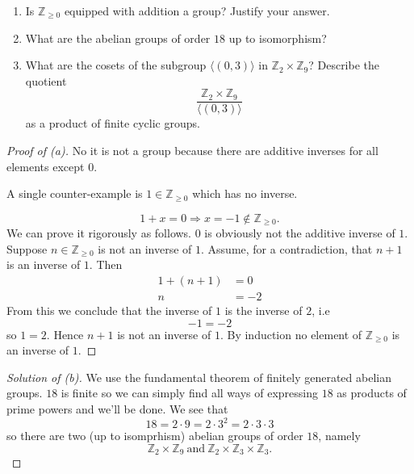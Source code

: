 \begin{prob}[1 Exam 2019]
    \begin{enumerate}[label=\alph*)]
        \item Is $\mathbb Z_{\geq 0}$ equipped with 
            addition a group? Justify your answer.

        \item What are the abelian groups of order $18$ up 
            to isomorphism?

        \item What are the cosets of the subgroup 
            $\langle (0,3)\rangle$ in $\mathbb Z_2 \times 
            \mathbb Z_9$? Describe the quotient 
            \[
                \frac{\mathbb Z_2 \times \mathbb Z_9}{
                    \langle(0,3)\rangle
                }
            \]
            as a product of finite cyclic groups.
    \end{enumerate}
\end{prob}
\begin{proof}[Proof of (a)]
    No it is not a group because there are additive inverses 
    for all elements except $0$. 

    A single counter-example is $1 \in \mathbb Z_{\geq 0}$ 
    which has no inverse.

    \[
        1 + x = 0 \Rightarrow x = -1 \not\in \mathbb Z_{\geq 0}.
    \]
    We can prove it rigorously as follows. 
    $0$ is obviously not the additive inverse of $1$. 
    Suppose $n \in \mathbb Z_{\geq 0}$ is not an inverse 
    of $1$. Assume, for a contradiction, that $n+1$ is 
    an inverse of $1$.
    Then 
    \begin{align*}
        1 + (n + 1) &= 0 \\ 
        n &= -2 
    \end{align*}
    From this we conclude that the inverse of $1$ is the 
    inverse of $2$, i.e 
    \[
        -1 = -2
    \]
    so $1 = 2$. Hence $n+1$ is not an inverse of $1$. 
    By induction no element of $\mathbb Z_{\geq 0}$ is an 
    inverse of $1$.
\end{proof}
\begin{proof}[Solution of (b)]
    We use the fundamental theorem of finitely generated 
    abelian groups. $18$ is finite so we can simply find 
    all ways of expressing $18$ as products of prime powers and 
    we'll be done.
    We see that 
    \[
        18 = 2 \cdot 9 = 2 \cdot 3^2 = 2 \cdot 3 \cdot 3
    \]
    so there are two (up to isomprhism) abelian groups of 
    order $18$, namely 
    \[
        \mathbb Z_2 \times \mathbb Z_9 \ \text{and} \ 
        \mathbb Z_2 \times \mathbb Z_3 \times \mathbb Z_3.
    \]
\end{proof}
